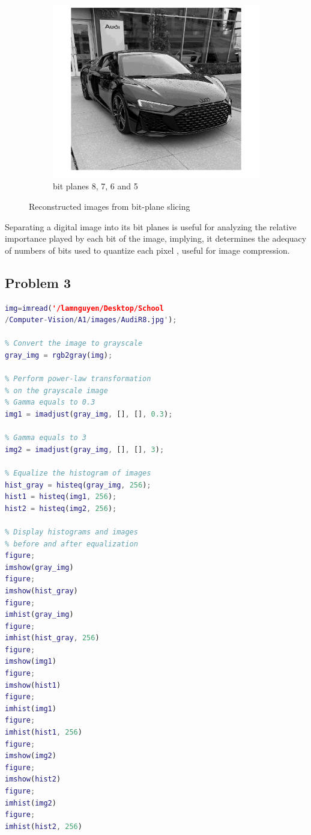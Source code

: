 \documentclass[conference]{IEEEtran}
\begin{document}
\begin{figure}[h!]
\begin{subfigure}[b]{0.3\linewidth}
\includegraphics[width=\linewidth]{images/img13.jpg}
\caption{bit planes 8, 7, 6 and 5}
\end{subfigure}
\caption{Reconstructed images from bit-plane slicing}
\label{fig:Reconstructed images from bit-plane slicing}
\end{figure}

Separating a digital image into its bit planes is useful for analyzing the relative importance played by each bit of the image, implying, it determines the adequacy of numbers of bits used to quantize each pixel , useful for image compression.

\newpage
\subsection{Problem 3}

\begin{lstlisting}[language=Matlab]
% Load the original image
img=imread('/lamnguyen/Desktop/School
/Computer-Vision/A1/images/AudiR8.jpg');

% Convert the image to grayscale
gray_img = rgb2gray(img);

% Perform power-law transformation 
% on the grayscale image
% Gamma equals to 0.3 
img1 = imadjust(gray_img, [], [], 0.3);

% Gamma equals to 3
img2 = imadjust(gray_img, [], [], 3);

% Equalize the histogram of images
hist_gray = histeq(gray_img, 256);
hist1 = histeq(img1, 256);
hist2 = histeq(img2, 256);

% Display histograms and images 
% before and after equalization
figure;
imshow(gray_img)
figure;
imshow(hist_gray)
figure;
imhist(gray_img)
figure;
imhist(hist_gray, 256)
figure;
imshow(img1)
figure;
imshow(hist1)
figure;
imhist(img1)
figure;
imhist(hist1, 256)
figure;
imshow(img2)
figure;
imshow(hist2)
figure;
imhist(img2)
figure;
imhist(hist2, 256)
\end{lstlisting}
\end{document}
